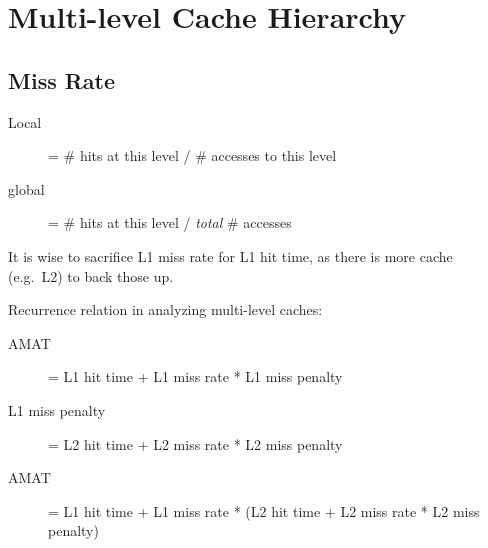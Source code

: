 \section{Multi-level Cache Hierarchy}
\subsection{Miss Rate}
\begin{description}
	\item[Local] = \# hits at this level / \# accesses to this level
	\item[global] = \# hits at this level / \emph{total} \# accesses
\end{description}
It is wise to sacrifice L1 miss rate for L1 hit time, as there is more cache (e.g.~L2) to back those up.

Recurrence relation in analyzing multi-level caches:
\begin{description}
    \item[AMAT] = L1 hit time + L1 miss rate * L1 miss penalty
    \item[L1 miss penalty] = L2 hit time + L2 miss rate * L2 miss penalty
    \item[AMAT] = L1 hit time + L1 miss rate * (L2 hit time + L2 miss rate * L2 miss penalty)
\end{description}